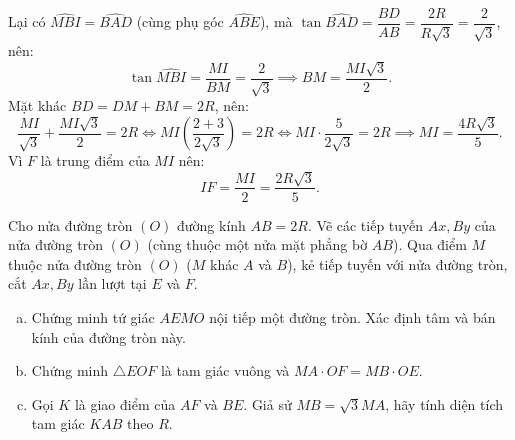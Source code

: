 \begin{bt}
{\begin{enumerate}[a)]
    Lại có $\widehat{MBI} = \widehat{BAD}$ (cùng phụ góc $\widehat{ABE}$), mà $\tan \widehat{BAD} = \dfrac{BD}{AB} = \dfrac{2R}{R\sqrt{3}} = \dfrac{2}{\sqrt{3}}$, nên:
    $$\tan \widehat{MBI} = \dfrac{MI}{BM} = \dfrac{2}{\sqrt{3}} \implies BM = \dfrac{MI\sqrt{3}}{2}.$$
    Mặt khác $BD = DM + BM = 2R$, nên:
    $$\dfrac{MI}{\sqrt{3}} + \dfrac{MI\sqrt{3}}{2} = 2R \iff MI\left(\dfrac{2 + 3}{2\sqrt{3}}\right) = 2R \iff MI \cdot \dfrac{5}{2\sqrt{3}} = 2R \implies MI = \dfrac{4R\sqrt{3}}{5}.$$
    Vì $F$ là trung điểm của $MI$ nên:
    $$IF = \dfrac{MI}{2} = \dfrac{2R\sqrt{3}}{5}.$$
\end{enumerate}
}
\end{bt}

\begin{bt}%
Cho nửa đường tròn $(O)$ đường kính $AB = 2R$. Vẽ các tiếp tuyến $Ax, By$ của nửa đường tròn $(O)$ (cùng thuộc một nửa mặt phẳng bờ $AB$). Qua điểm $M$ thuộc nửa đường tròn $(O)$ ($M$ khác $A$ và $B$), kẻ tiếp tuyến với nửa đường tròn, cắt $Ax, By$ lần lượt tại $E$ và $F$.
\begin{enumerate}[a)]
    \item Chứng minh tứ giác $AEMO$ nội tiếp một đường tròn. Xác định tâm và bán kính của đường tròn này.
    \item Chứng minh $\triangle EOF$ là tam giác vuông và $MA \cdot OF = MB \cdot OE$.
    \item Gọi $K$ là giao điểm của $AF$ và $BE$. Giả sử $MB = \sqrt{3}MA$, hãy tính diện tích tam giác $KAB$ theo $R$.
\end{enumerate}
\end{bt}
